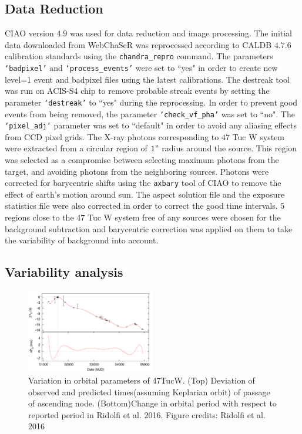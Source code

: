 \documentclass[a4paper,fleqn,usenatbib]{mnras}
\begin{document}
\subsection{Data Reduction}
CIAO version $4.9$ was used for data reduction and image processing. The initial data downloaded from WebChaSeR was reprocessed 
according to CALDB $4.7.6$ calibration standards using the \texttt{chandra\_repro} command. The parameters \texttt{`badpixel'} and \texttt{`process\_events'} were set to ``yes" in order to create new level=1 event and badpixel files using the latest calibrations. The destreak tool was run on ACIS-S4 chip to remove probable streak events by setting the parameter \texttt{`destreak'} to ``yes" during the reprocessing. In order to prevent good events from being removed, the parameter \texttt{`check\_vf\_pha'} was set to ``no". The \texttt{`pixel\_adj'} parameter was set to ``default" in order to avoid any aliasing effects from CCD pixel grids. The X-ray photons corresponding to 
$47$ Tuc W system were extracted from a circular region of $1"$ radius around the source. This region was selected as a compromise 
between selecting maximum photons from the target, and avoiding photons from the neighboring sources.
Photons were corrected for barycentric shifts using the \texttt{axbary} tool of CIAO to remove the effect of earth's motion around sun. 
The aspect solution file and the exposure statistics file were also corrected in order to correct the good time intervals. $5$ regions close to the $47$ Tuc W system free of any sources were chosen for the 
background subtraction and barycentric correction was applied on them to take the variability of background into account.

\subsection{Variability analysis}
\begin{figure}
\centering
\includegraphics[width=0.5\textwidth]{Figures/ephemeris.png}
\caption{Variation in orbital parameters of 47TucW. (Top) Deviation of observed and predicted times(assuming Keplarian orbit) of passage of ascending node. (Bottom)Change in orbital period with respect to reported period in Ridolfi et al. 2016. Figure credits: Ridolfi et al. 2016}
\label{fig:ephem}
\end{figure}
\end{document}
